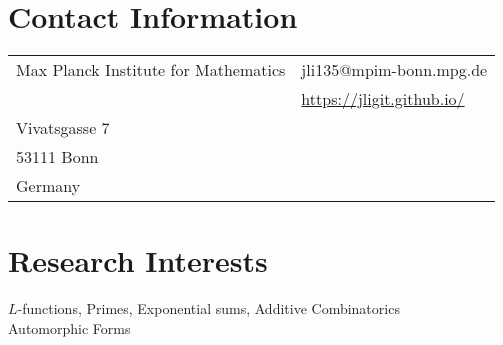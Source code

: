 \documentclass[margin,line,pifont,palatino,courier]{res}
\begin{document}

\begin{resume}

\section{\sc Contact Information}
%


\vspace{.05in}
\begin{tabular}{@{}p{2.5in}p{2.5in}}
Max Planck Institute   for Mathematics                 & \hfill{jli135@mpim-bonn.mpg.de}\\

 & \hfill{\href{https://jligit.github.io/}{https://jligit.github.io/}}\\

Vivatsgasse 7 &\\
53111 Bonn
             & \\
Germany   & 

\end{tabular}

\section{\sc Research Interests}
$L$-functions, Primes,  Exponential sums, Additive Combinatorics\\
Automorphic Forms

\end{resume}
\end{document}
